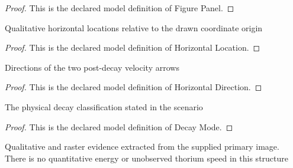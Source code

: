 \begin{proof}
  This is the declared model definition of Figure Panel.
\end{proof}
\begin{definition}
  \label{def:physics:phyx-mini-0551:phyxminiproblems-problemphyxmini0551-horizontallocation}
  Qualitative horizontal locations relative to the drawn coordinate origin
\end{definition}
\begin{proof}
  This is the declared model definition of Horizontal Location.
\end{proof}
\begin{definition}
  \label{def:physics:phyx-mini-0551:phyxminiproblems-problemphyxmini0551-horizontaldirection}
  Directions of the two post-decay velocity arrows
\end{definition}
\begin{proof}
  This is the declared model definition of Horizontal Direction.
\end{proof}
\begin{definition}
  \label{def:physics:phyx-mini-0551:phyxminiproblems-problemphyxmini0551-decaymode}
  The physical decay classification stated in the scenario
\end{definition}
\begin{proof}
  This is the declared model definition of Decay Mode.
\end{proof}
\begin{definition}
  \label{def:physics:phyx-mini-0551:phyxminiproblems-problemphyxmini0551-uraniumdecayfigure}
  Qualitative and raster evidence extracted from the supplied primary image. There is no quantitative energy or unobserved thorium speed in this structure
\end{definition}

